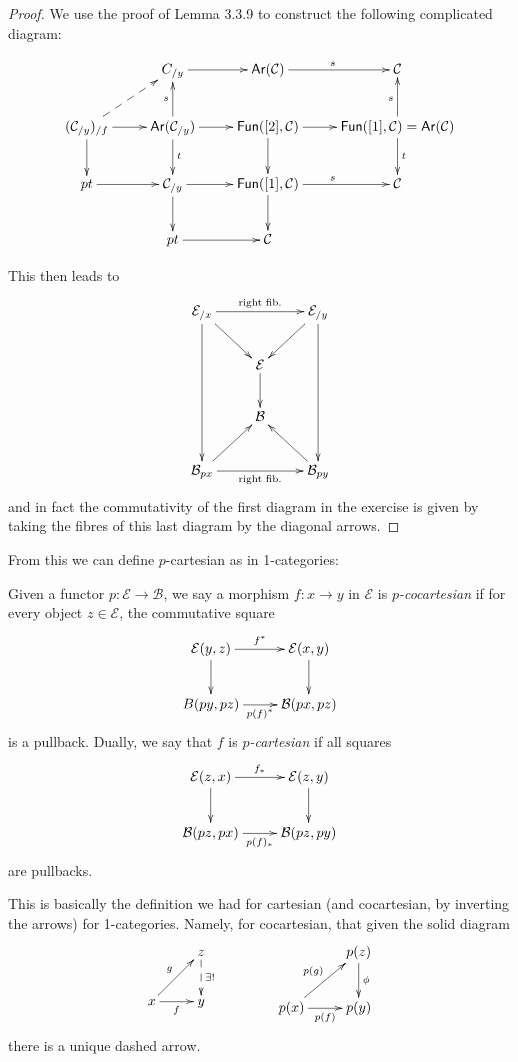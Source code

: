 \begin{proof}
We use the proof of Lemma 3.3.9
to construct the following complicated
diagram:

$$
\xymatrix{
&C_{/y}\ar[r]&\mathsf{Ar}(\mathcal{C})\ar[r]
^s&\mathcal{C}\\
(\mathcal{C}_{/y})_{/f}\ar@{-->}[ur]\ar[r]
\ar[d]
&\mathsf{Ar}(\mathcal{C}_{/y})\ar[d]^t\ar[r]
\ar[u]^s&
\mathsf{Fun}([2],\mathcal{C})\ar[d]\ar[r]
&\mathsf{Fun}([1],\mathcal{C})=\mathsf{Ar}
(\mathcal{C})\ar[d]^t\ar[u]^s\\
pt\ar[r]&\mathcal{C}_{/y}\ar[d]\ar[r]
&\mathsf{Fun}([1],\mathcal{C})\ar[r]^s
\ar[d]&\mathcal{C}\\
&pt\ar[r]&\mathcal{C}
}
$$

This then leads to
$$
\xymatrix{
\mathcal{E}_{/x}\ar[rd]\ar[rr]^{\text{right
fib.}}\ar[ddd]
& & \mathcal{E}_{/y}\ar[ddd]\ar[dl]\\
& \mathcal{E}\ar[d]\\
&\mathcal{B}\\
\mathcal{B}_{px}\ar[ur]\ar[rr]_{\text{right
fib.}}&&
\mathcal{B}_{py}\ar[lu]
}
$$
and in fact the commutativity of the first
diagram
in the exercise is given by taking the fibres
of this last diagram by the diagonal arrows.
\end{proof}
\noindent
From this we can define $p$-cartesian as in
1-categories:

\begin{definition}
\label{definition-p-cocartesian}
Given a functor $p:\mathcal{E} \to
\mathcal{B}$,
we say a morphism $f:x\to y$
in $\mathcal{E}$ is {\it $p$-cocartesian}
if for every object $z \in \mathcal{E}$, the
commutative square
$$
\xymatrix{
\mathcal{E}(y,z)\ar[r]^{f^*}\ar[d]&
\mathcal{E}(x,y)\ar[d]\\
B(py,pz)\ar[r]_{p(f)^*}&\mathcal{B}(px,pz)
}
$$
is a pullback. Dually, we say that $f$ is
{\it $p$-cartesian}
if all squares
$$
\xymatrix{
\mathcal{E}(z,x)\ar[r]^{f_*}\ar[d]&
\mathcal{E}(z,y)\ar[d]\\
\mathcal{B}(pz,px)\ar[r]_{p(f)_*}&\mathcal{B}
(pz,py)
}
$$
are pullbacks.
\end{definition}

\noindent
This is basically the definition we had for
cartesian (and cocartesian, by inverting the
arrows)
for 1-categories. Namely, for cocartesian,
that given the solid diagram
$$
\xymatrix{
&z\ar@{-->}[d]^{\exists !}\\
x\ar[ur]^g\ar[r]_f&y
}
\qquad \qquad
\xymatrix{
&p(z)\ar[d]^\phi\\
p(x)\ar[ur]^{p(g)}\ar[r]_{p(f)}&p(y)
}
$$
there is a unique dashed arrow.

